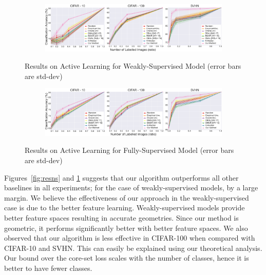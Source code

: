 \documentclass{article} %
\begin{document}
\begin{figure}[tb]
    \centering
    \begin{subfigure}[b]{\textwidth}
        \includegraphics[width=\textwidth]{fig_ws5.pdf}
    \end{subfigure}
    \vspace{-5mm}
    \caption{Results on Active Learning for Weakly-Supervised Model (error bars are std-dev)}\label{fig:ressemi}
        \vspace{-3mm}
    \label{fig:resns}
   \vspace{5mm}
    \begin{subfigure}[b]{\textwidth}
        \includegraphics[width=\textwidth]{fs_fig5.pdf}
    \end{subfigure}
        \vspace{-5mm}
    \caption{Results on Active Learning for Fully-Supervised Model (error bars are std-dev)}\label{fig:resnosemi}
        \vspace{-5mm}
    \label{fig:ress}
\end{figure}

Figures~\ref{fig:resns} and \ref{fig:ress} suggests that our algorithm outperforms all other baselines in all
experiments; for the case of weakly-supervised models, by a large margin. We believe the effectiveness of our approach
in the weakly-supervised case is due to the better feature learning. Weakly-supervised models provide better feature
spaces resulting in accurate geometries. Since our method is geometric, it performs significantly better with better
feature spaces. We also observed that our algorithm is less effective in CIFAR-100 when compared with
CIFAR-10 and SVHN. This can easily be explained using our theoretical analysis. Our bound over the core-set loss scales with the
number of classes, hence it is better to have fewer classes.
\end{document}

